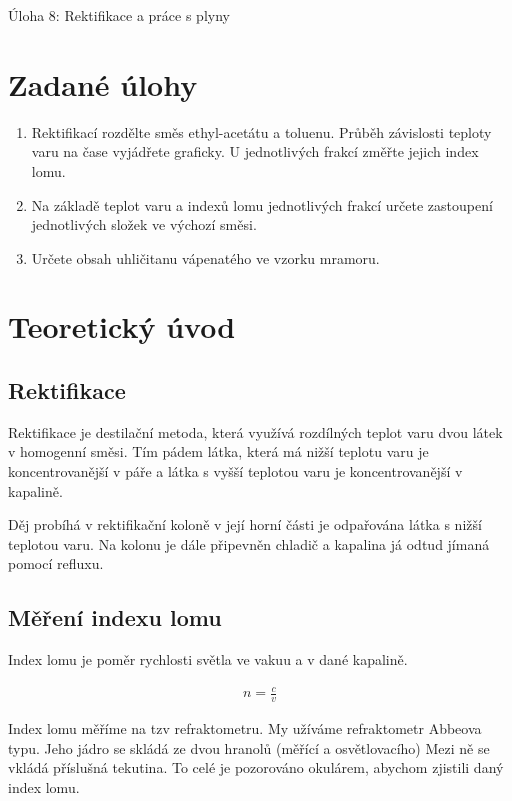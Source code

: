 \documentclass[13pt, a4paper, twoside]{article}z
\begin{document}
\begin{center}
    \Huge
    Úloha 8: Rektifikace a práce s plyny
\end{center}
\large \onehalfspacing
\section*{Zadané úlohy}
\begin{enumerate}
    \item Rektifikací rozdělte směs ethyl-acetátu a toluenu. Průběh závislosti teploty varu na čase
    vyjádřete graficky. U jednotlivých frakcí změřte jejich index lomu.
    \item  Na základě teplot varu a indexů lomu jednotlivých frakcí určete zastoupení jednotlivých
    složek ve výchozí směsi.
    \item Určete obsah uhličitanu vápenatého ve vzorku mramoru.
\end{enumerate}

\section*{Teoretický úvod}
\subsection*{Rektifikace}
Rektifikace je destilační metoda, která využívá rozdílných teplot varu dvou látek v homogenní směsi. Tím pádem látka, která má nižší teplotu varu je koncentrovanější v páře a látka s vyšší teplotou varu je koncentrovanější v kapalině.


Děj probíhá v rektifikační koloně v její horní části je odpařována látka s nižší teplotou varu. Na kolonu je dále připevněn chladič a kapalina já odtud jímaná pomocí refluxu.

\subsection*{Měření indexu lomu}
Index lomu je poměr rychlosti světla ve vakuu a v dané kapalině.

\begin{align*}
    n = \frac{c}{v}
\end{align*}


Index lomu měříme na tzv refraktometru. My užíváme refraktometr Abbeova typu. Jeho jádro se skládá ze dvou hranolů (měřící a osvětlovacího) Mezi ně se vkládá příslušná tekutina. To celé je pozorováno okulárem, abychom zjistili daný index lomu.
\end{document}
